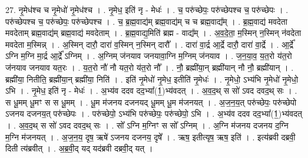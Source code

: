 \documentclass[17pt]{extarticle}
\begin{document}
27. नृ॒मेध॑श्च च नृ॒मेधो॑ नृ॒मेध॑श्च । . नृ॒मेध॒ इति॑ नृ - मेधः॑ । . च॒ परु॑च्छेपः॒ परु॑च्छेपश्च च॒ परु॑च्छेपः । . परु॑च्छेपश्च च॒ परु॑च्छेपः॒ परु॑च्छेपश्च । . च॒ ब्र॒ह्म॒वाद्य॑म् ब्रह्म॒वाद्य॑म् च च ब्रह्म॒वाद्य᳚म् । . ब्र॒ह्म॒वाद्य॑ मवदेता मवदेताम् ब्रह्म॒वाद्य॑म् ब्रह्म॒वाद्य॑ मवदेताम् । . ब्र॒ह्म॒वाद्य॒मिति॑ ब्रह्म - वाद्य᳚म् । . अ॒व॒दे॒ता॒ म॒स्मिन् न॒स्मिन् न॑वदेता मवदेता म॒स्मिन्न् । . अ॒स्मिन् दारौ॒ दारा॑ व॒स्मिन् न॒स्मिन् दारौ᳚ । . दारा॑ वा॒र्द्र आ॒र्द्रे दारौ॒ दारा॑ वा॒र्द्रे । . आ॒र्द्रे᳚ ऽग्नि म॒ग्नि मा॒र्द्र आ॒र्द्रे᳚ ऽग्निम् । . अ॒ग्निम् ज॑नयाव जनयावा॒ग्नि म॒ग्निम् ज॑नयाव । . ज॒न॒या॒व॒ य॒त॒रो य॑त॒रो ज॑नयाव जनयाव यत॒रः । . य॒त॒रो नौ॑ नौ यत॒रो य॑त॒रो नौ᳚ । . नौ॒ ब्रह्मी॑या॒न् ब्रह्मी॑यान् नौ नौ॒ ब्रह्मी॑यान् । . ब्रह्मी॑या॒ नितीति॒ ब्रह्मी॑या॒न् ब्रह्मी॑या॒ निति॑ । . इति॑ नृ॒मेधो॑ नृ॒मेध॒ इतीति॑ नृ॒मेधः॑ । . नृ॒मेधो॒ ऽभ्य॑भि नृ॒मेधो॑ नृ॒मेधो॒ ऽभि । . नृ॒मेध॒ इति॑ नृ - मेधः॑ । . अ॒भ्य॑व ददव दद॒भ्या᳚(1॒)भ्य॑वदत् । . अ॒व॒द॒थ् स सो॑ ऽवद दवद॒थ् सः । . स धू॒मम् धू॒मꣳ स स धू॒मम् । . धू॒म म॑जनय दजनयद् धू॒मम् धू॒म म॑जनयत् । . अ॒ज॒न॒य॒त् परु॑च्छेपः॒ परु॑च्छेपो ऽजनय दजनय॒त् परु॑च्छेपः । . परु॑च्छेपो॒ ऽभ्य॑भि परु॑च्छेपः॒ परु॑च्छेपो॒ ऽभि । . अ॒भ्य॑व ददव दद॒भ्या᳚(1॒)भ्य॑वदत् । . अ॒व॒द॒थ् स सो॑ ऽवद दवद॒थ् सः । . सो᳚ ऽग्नि म॒ग्निꣳ स सो᳚ ऽग्निम् । . अ॒ग्नि म॑जनय दजनय द॒ग्नि म॒ग्नि म॑जनयत् । . अ॒ज॒न॒य॒ दृष॒ ऋषे॑ ऽजनय दजनय॒ दृषे᳚ । . ऋष॒ इतीत्यृष॒ ऋष॒ इति॑ । . इत्य॑ब्रवी दब्रवी॒ दिती त्य॑ब्रवीत् । . अ॒ब्र॒वी॒द् यद् यद॑ब्रवी दब्रवी॒द् यत् । \newline
\end{document}
